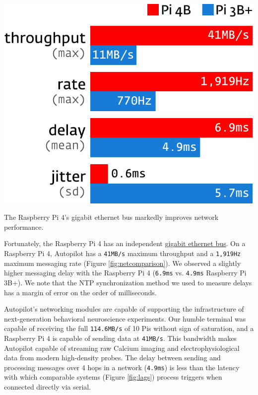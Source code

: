 \begin{marginfigure}[0.1cm]
\includegraphics[]{figures/test_4_comparison.pdf}
\caption{The Raspberry Pi 4's gigabit ethernet bus markedly improves network performance.}
\label{fig:netcomparison}
\end{marginfigure}

Fortunately, the Raspberry Pi 4 has an independent \href{https://www.raspberrypi.org/magpi/raspberry-pi-4-specs-benchmarks/}{gigabit ethernet bus}. On a Raspberry Pi 4, Autopilot has a \texttt{41MB/s} maximum throughput and a \texttt{1,919Hz} maximum messaging rate (Figure \ref{fig:netcomparison}). We observed a slightly higher messaging delay with the Raspberry Pi 4 (\texttt{6.9ms} vs. \texttt{4.9ms} Raspberry Pi 3B+). We note that the NTP synchronization method we used to measure delays has a margin of error on the order of milliseconds. 

Autopilot's networking modules are capable of supporting the infrastructure of next-generation behavioral neuroscience experiments. Our humble terminal was capable of receiving the full \texttt{114.6MB/s} of 10 Pis without sign of saturation, and a Raspberry Pi 4 is capable of sending data at \texttt{41MB/s}. This bandwidth makes Autopilot capable of streaming raw Calcium imaging and electrophysiological data from modern high-density probes. The delay between sending and processing messages over 4 hops in a network (\texttt{4.9ms}) is less than the latency with which comparable systems (Figure \ref{fig:lags}) process triggers when connected directly via serial.

